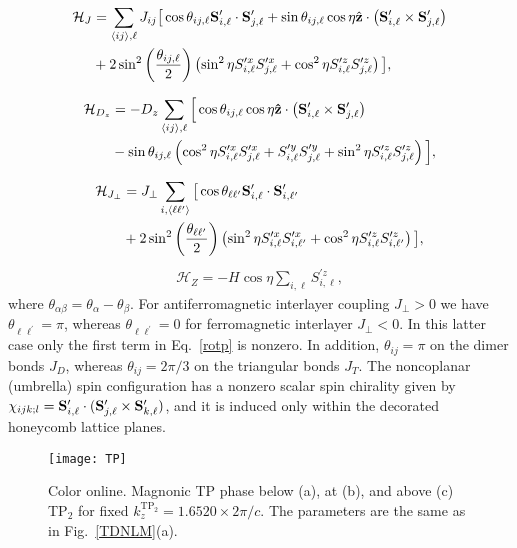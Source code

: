 \documentclass[aps,twocolumn,amsmath,amssymb, superscriptaddress]{revtex4}
\def\lb{\left(}
\def\rb{\right)}
\def\ra{\rangle}
\def\la{\langle}
\begin{document}
  \begin{align}
  \mathcal H_J&= \sum_{ \la ij\ra,\ell}J_{ij}\big[\cos\theta_{ij,\ell} \bold{ S}_{i,\ell}^\prime\cdot \bold{ S}_{j,\ell}^\prime+ \sin\theta_{ij,\ell}\cos\eta \hat{\bold z}\cdot\lb \bold{ S}_{i,\ell}^\prime\times\bold{ S}_{j,\ell}^\prime\rb \\&\nonumber+2\sin^2\lb\frac{\theta_{ij,\ell}}{2}\rb\lb\sin^2\eta  S_{i,\ell}^{\prime x}S_{j,\ell}^{\prime x} +\cos^2\eta S_{i,\ell}^{\prime z} S_{j,\ell}^{\prime z}\rb\big],
  \end{align}
  
 \begin{align}
\mathcal   H_{D_z}&= -D_z\sum_{\la ij\ra,\ell}\Big[\cos\theta_{ij,\ell}\cos\eta {\bf \hat z}\cdot \lb \bold S_{i,\ell}^\prime\times\bold S_{j,\ell}^\prime\rb  \\&\nonumber - \sin\theta_{ij,\ell}\lb \cos^2\eta S_{i,\ell}^{\prime x}S_{j,\ell}^{\prime x} + S_{i,\ell}^{\prime y}S_{j,\ell}^{ \prime y}+\sin^2\eta S_{i,\ell}^{\prime z}S_{j,\ell}^{\prime z}\rb\Big], 
     \end{align}
 
    \begin{align}
  \mathcal H_{J_\perp}&= J_\perp\sum_{ i,\la \ell\ell^\prime\ra}\big[\cos\theta_{\ell\ell^\prime} \bold{ S}_{i,\ell}^\prime\cdot \bold{ S}_{i,\ell^\prime}^\prime  \\&\nonumber  +2\sin^2\lb\frac{\theta_{\ell\ell^\prime}}{2}\rb\lb\sin^2\eta  S_{i,\ell}^{\prime x}S_{i,\ell^\prime}^{\prime x} +\cos^2\eta S_{i,\ell}^{\prime z} S_{i,\ell^\prime}^{\prime z}\rb\big],
  \label{rotp}
  \end{align}
  \begin{align}
 \mathcal H_Z= -H\cos\eta\sum_{i,\ell} S_{i,\ell}^{\prime z},
  \end{align}
where $\theta_{\alpha\beta}=\theta_{\alpha}-\theta_{\beta}$. For antiferromagnetic interlayer coupling $J_\perp>0$ we have $\theta_{\ell\ell^\prime}=\pi$, whereas  $\theta_{\ell\ell^\prime}=0$ for ferromagnetic interlayer $J_\perp<0$. In this latter case  only the first term in  Eq.~\eqref{rotp} is nonzero. In addition, $\theta_{ij}=\pi$ on the dimer bonds $J_D$, whereas $\theta_{ij}=2\pi/3$ on the triangular  bonds $J_T$.  The noncoplanar  (umbrella) spin configuration has a nonzero scalar spin chirality given by $\chi_{ijk;l}=  {\bf S}_{i,\ell}^\prime\cdot({\bf S}_{j,\ell}^\prime\times{\bf S}_{k,\ell}^\prime)$, and it is induced only within the decorated honeycomb lattice  planes. 
 \begin{figure}
\centering
\texttt{[image: TP]}
\caption{Color online. Magnonic TP phase below (a), at (b), and above (c) TP$_2$  for fixed  $k_z^{\text{TP}_2}=1.6520\times 2\pi/c$. The parameters are the same as  in Fig.~\ref{TDNLM}(a).}
\label{TP}
\end{figure} 
\end{document}
